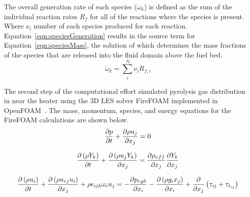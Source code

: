   The overall generation rate of each species ($\dot{\omega}_k$) is defined as the sum of the individual reaction rates $R_f$ for all of the reactions where the species is present. Where $\nu_i$ number of each species produced for each reaction. Equation~\ref{eqn:speciesGeneration} results in the source term for Equation~\ref{eqn:speciesMass}, the solution of which determines the mass fractions of the species that are released into the fluid domain above the fuel bed.
        \begin{equation}
            \dot{\omega}_k = \sum_i^N \nu_i R_{f, i}
            \label{eqn:speciesGeneration}
        \end{equation}
    
    
   The second step of the computational effort simulated pyrolysis gas distribution in near the heater using the 3D LES solver FireFOAM implemented in OpenFOAM~\cite{Foundation2020}. The mass, momentum, species, and energy equations for the FireFOAM calculations are shown below.
            \begin{equation}
                \pder[p]{t} + \pder [\rho u_{j}] {x_{j}} = 0
            \end{equation}
            
            \begin{equation}
                \pder[\left( \rho Y_{k} \right)]{t}  + \pder[\left( \rho u_{j} Y_{k}\right)]{x_{j}}  = 
                \pder[\mu_{eff}]{x_{j}}  \pder[Y_{k}]{x_{j}} 
            \end{equation}
            
            \begin{equation}
                \pder[\left(\rho u_{i}\right)]{t}  + \pder[\left( \rho u_{rj}u_{i}\right)]{x_{j}}  + \rho \epsilon_{ijk}\omega_{i}u_{j}= - 
                \pder[p_{rgh}]{x_{i}}  - \pder[\left( \rho g_i x_j \right)] {x_i}  + \pder{x_j} \left( \tau_{ij} + \tau_{t_{ij}} \right)
            \end{equation}
            
